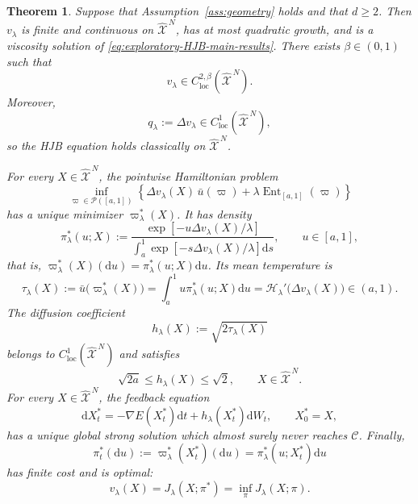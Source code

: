 \documentclass[11pt]{article}
\def\Xc{{\mathcal X}}
\def\hX{\widehat{\Xc}^{\,N}}
\newcommand{\dd}{\mathrm{d}}
\newcommand{\Ent}{\operatorname{Ent}}
\newcommand{\Coll}{\mathscr C}
\newtheorem{theorem}{Theorem}[section]
\theoremstyle{definition}
\theoremstyle{remark}
\numberwithin{equation}{section}
\begin{document}
\begin{theorem}\label{thm:HJB}
Suppose that Assumption~\ref{ass:geometry} holds and that $d\ge2$.  Then $v_\lambda$ is finite and
continuous on $\hX$, has at most quadratic growth, and is a viscosity solution of
\eqref{eq:exploratory-HJB-main-results}.  There exists $\beta\in(0,1)$ such that
\begin{equation}\label{eq:v-C2beta}
 v_\lambda\in C^{2,\beta}_{\mathrm{loc}}(\hX).
\end{equation}
Moreover,
\begin{equation}\label{eq:q-C1}
 q_\lambda:=\Delta v_\lambda\in C^1_{\mathrm{loc}}(\hX),
\end{equation}
so the HJB equation holds classically on $\hX$.

For every $X\in\hX$, the pointwise Hamiltonian problem
\begin{equation}\label{eq:pointwise-Hamiltonian-minimization}
 \inf_{\varpi\in\mathcal P([a,1])}
 \left\{
 \Delta v_\lambda(X)\,\bar u(\varpi)
 +\lambda\Ent_{[a,1]}(\varpi)
 \right\}
\end{equation}
has a unique minimizer $\varpi_\lambda^*(X)$.  It has density
\begin{equation}\label{eq:optimal-density}
 \pi_\lambda^*(u;X)
 :=
 \frac{\exp[-u\Delta v_\lambda(X)/\lambda]}
 {\displaystyle\int_a^1\exp[-s\Delta v_\lambda(X)/\lambda]\dd s},
 \qquad u\in[a,1],
\end{equation}
that is,
$\varpi_\lambda^*(X)(\dd u)=\pi_\lambda^*(u;X)\dd u$.  Its mean temperature is
\begin{equation}\label{eq:optimal-mean-temperature}
 \tau_\lambda(X)
 :=\bar u\bigl(\varpi_\lambda^*(X)\bigr)
 =\int_a^1u\pi_\lambda^*(u;X)\dd u
 =\mathscr H_\lambda'\bigl(\Delta v_\lambda(X)\bigr)
 \in(a,1).
\end{equation}
The diffusion coefficient
\begin{equation}\label{eq:h-feedback}
 h_\lambda(X):=\sqrt{2\tau_\lambda(X)}
\end{equation}
belongs to $C^1_{\mathrm{loc}}(\hX)$ and satisfies
\[
 \sqrt{2a}\le h_\lambda(X)\le\sqrt2,
 \qquad X\in\hX.
\]
For every $X\in\hX$, the feedback equation
\begin{equation}\label{eq:optimal-feedback-SDE}
 \dd X_t^*
 =-\nabla E(X_t^*)\dd t+h_\lambda(X_t^*)\dd W_t,
 \qquad X_0^*=X,
\end{equation}
has a unique global strong solution which almost surely never reaches $\Coll$.  Finally,
\begin{equation}\label{eq:optimal-relaxed-control-process}
 \pi_t^*(\dd u)
 :=\varpi_\lambda^*(X_t^*)(\dd u)
 =\pi_\lambda^*(u;X_t^*)\dd u
\end{equation}
has finite cost and is optimal:
\begin{equation}\label{eq:verification-value}
 v_\lambda(X)=J_\lambda(X;\pi^*)=\inf_\pi J_\lambda(X;\pi).
\end{equation}
\end{theorem}
\end{document}
